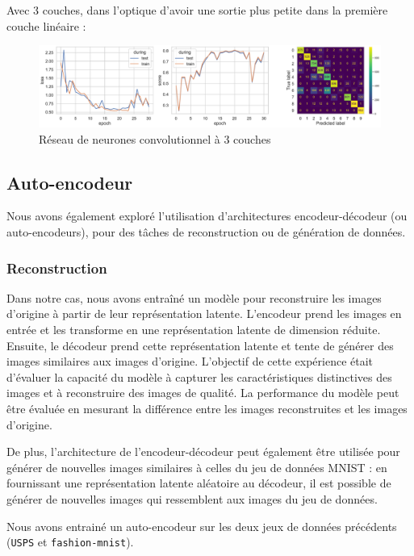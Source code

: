\documentclass{article}
\begin{document}
Avec 3 couches, dans l'optique d'avoir une sortie plus petite dans la première couche linéaire :

\begin{figure}[htbp]
    \centering
    \includegraphics[width=\textwidth]{conv/fashion_conv_3layers_2linear.pdf}
    \caption{Réseau de neurones convolutionnel à 3 couches}
    \label{fig:conv3layers_fashion}
\end{figure}

\subsection{Auto-encodeur}


Nous avons également exploré l'utilisation d'architectures encodeur-décodeur (ou auto-encodeurs), pour des tâches de reconstruction ou de génération de données.

\subsubsection{Reconstruction}

Dans notre cas, nous avons entraîné un modèle pour reconstruire les images d'origine à partir de leur représentation latente. L'encodeur prend les images en entrée et les transforme en une représentation latente de dimension réduite. Ensuite, le décodeur prend cette représentation latente et tente de générer des images similaires aux images d'origine. L'objectif de cette expérience était d'évaluer la capacité du modèle à capturer les caractéristiques distinctives des images et à reconstruire des images de qualité. La performance du modèle peut être évaluée en mesurant la différence entre les images reconstruites et les images d'origine.

De plus, l'architecture de l'encodeur-décodeur peut également être utilisée pour générer de nouvelles images similaires à celles du jeu de données MNIST : en fournissant une représentation latente aléatoire au décodeur, il est possible de générer de nouvelles images qui ressemblent aux images du jeu de données.

Nous avons entrainé un auto-encodeur sur les deux jeux de données précédents (\texttt{USPS} et \texttt{fashion-mnist}). 
\end{document}
